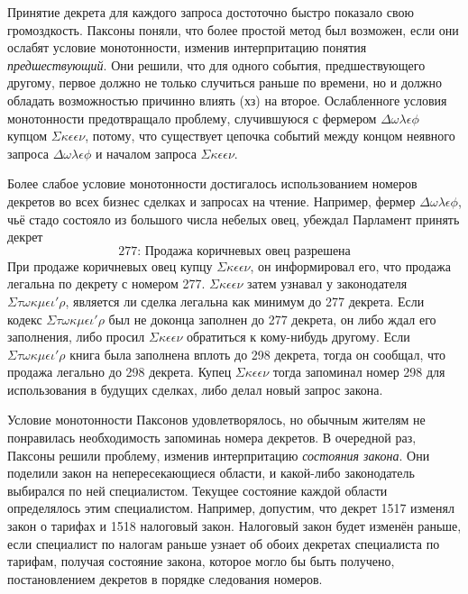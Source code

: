 \documentclass[12pt, a4paper]{article} %
\begin{document}
Принятие декрета для каждого запроса достоточно быстро показало свою громоздкость. Паксоны поняли, что более простой метод был возможен, если они ослабят условие монотонности, изменив интерпритацию понятия \textit{предшествующий}. Они решили, что для одного события, предшествующего другому, первое должно не только случиться раньше по времени, но и должно обладать возможностью причинно влиять (хз) на второе. Ослабленноге условия монотонности предотвращало проблему, случившуюся с фермером $\Delta\omega\lambda\epsilon\phi$ купцом $\Sigma\kappa\epsilon\epsilon\nu$, потому, что существует цепочка событий между концом неявного запроса $\Delta\omega\lambda\epsilon\phi$ и началом запроса $\Sigma\kappa\epsilon\epsilon\nu$. 

Более слабое условие монотонности достигалось использованием номеров декретов во всех бизнес сделках и запросах на чтение. Например, фермер $\Delta\omega\lambda\epsilon\phi$, чьё стадо состояло из большого числа небелых овец, убеждал Парламент принять декрет
\[
    \mbox{277: Продажа коричневых овец разрешена}
\]
При продаже коричневых овец купцу $\Sigma\kappa\epsilon\epsilon\nu$, он информировал его, что продажа легальна по декрету с номером 277. $\Sigma\kappa\epsilon\epsilon\nu$ затем узнавал у законодателя $\Sigma\tau\omega\kappa\mu\epsilon\iota'\rho$, является ли сделка легальна как минимум до 277 декрета. Если кодекс $\Sigma\tau\omega\kappa\mu\epsilon\iota'\rho$ был не доконца заполнен до 277 декрета, он либо ждал его заполнения, либо просил  $\Sigma\kappa\epsilon\epsilon\nu$ обратиться к кому-нибудь другому. Если  $\Sigma\tau\omega\kappa\mu\epsilon\iota'\rho$ книга была заполнена вплоть до 298 декрета, тогда он сообщал, что продажа легально до 298 декрета. Купец $\Sigma\kappa\epsilon\epsilon\nu$ тогда запоминал номер 298 для использования в будущих сделках, либо делал новый запрос закона.

Условие монотонности Паксонов удовлетворялось, но обычным жителям не понравилась необходимость запоминаь номера декретов. В очередной раз, Паксоны решили проблему, изменив интерпритацию \textit{состояния закона}. Они поделили закон на непересекающиеся области, и какой-либо законодатель выбирался по ней специалистом. Текущее состояние каждой области определялось этим специалистом. Например, допустим, что декрет 1517 изменял закон о тарифах и 1518 налоговый закон. Налоговый закон будет изменён раньше, если специалист по налогам раньше узнает об обоих декретах специалиста по тарифам, получая состояние закона, которое могло бы быть получено, постановлением декретов в порядке следования номеров.
\end{document}
